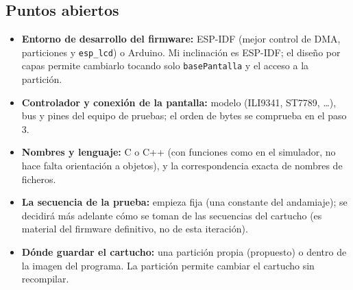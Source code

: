 \subsection{Puntos abiertos}
\label{sec:F6I92Abiertos}

\begin{itemize}
	\item \textbf{Entorno de desarrollo del firmware:} ESP-IDF (mejor control de DMA, particiones y \texttt{esp\_lcd}) o Arduino. Mi inclinación es ESP-IDF; el diseño por capas permite cambiarlo tocando solo \texttt{basePantalla} y el acceso a la partición.
	\item \textbf{Controlador y conexión de la pantalla:} modelo (ILI9341, ST7789, \ldots), bus y pines del equipo de pruebas; el orden de bytes se comprueba en el paso 3.
	\item \textbf{Nombres y lenguaje:} C o C++ (con funciones como en el simulador, no hace falta orientación a objetos), y la correspondencia exacta de nombres de ficheros.
	\item \textbf{La secuencia de la prueba:} empieza fija (una constante del andamiaje); se decidirá más adelante cómo se toman de las secuencias del cartucho (es material del firmware definitivo, no de esta iteración).
	\item \textbf{Dónde guardar el cartucho:} una partición propia (propuesto) o dentro de la imagen del programa. La partición permite cambiar el cartucho sin recompilar.
\end{itemize}

\clearpage
